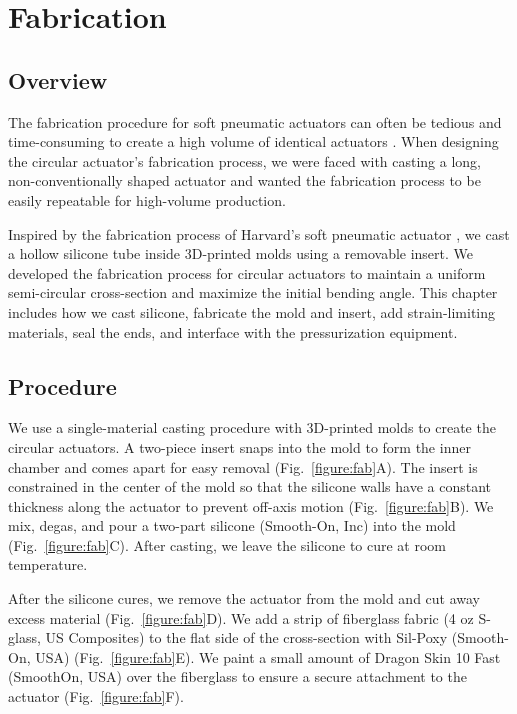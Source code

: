 \chapter{Fabrication}
\label{chapter:fabrication}

\section{Overview}

The fabrication procedure for soft pneumatic actuators can often be tedious and time-consuming to create a high volume of identical actuators \cite{hu_precurved_2022}. When designing the circular actuator's fabrication process, we were faced with casting a long, non-conventionally shaped actuator and wanted the fabrication process to be easily repeatable for high-volume production. 

Inspired by the fabrication process of Harvard's soft pneumatic actuator \cite{galloway_mechanically_2013, polygerinos_modeling_2015}, we cast a hollow silicone tube inside 3D-printed molds using a removable insert. We developed the fabrication process for circular actuators to maintain a uniform semi-circular cross-section and maximize the initial bending angle. This chapter includes how we cast silicone, fabricate the mold and insert, add strain-limiting materials, seal the ends, and interface with the pressurization equipment. 

\section{Procedure}

We use a single-material casting procedure with 3D-printed molds to create the circular actuators. A two-piece insert snaps into the mold to form the inner chamber and comes apart for easy removal (Fig.~\ref{figure:fab}A). The insert is constrained in the center of the mold so that the silicone walls have a constant thickness along the actuator to prevent off-axis motion (Fig.~\ref{figure:fab}B). We mix, degas, and pour a two-part silicone (Smooth-On, Inc) into the mold (Fig.~\ref{figure:fab}C). After casting, we leave the silicone to cure at room temperature. 

After the silicone cures, we remove the actuator from the mold and cut away excess material (Fig.~\ref{figure:fab}D). We add a strip of fiberglass fabric (4 oz S-glass, US Composites) to the flat side of the cross-section with Sil-Poxy (Smooth-On, USA) (Fig.~\ref{figure:fab}E). We paint a small amount of Dragon Skin 10 Fast (SmoothOn, USA) over the fiberglass to ensure a secure attachment to the actuator (Fig.~\ref{figure:fab}F). 

